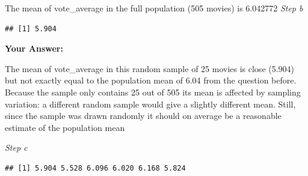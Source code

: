 \documentclass[
]{article}
\newenvironment{Shaded}{\begin{snugshade}}{\end{snugshade}}
\newcommand{\CommentTok}[1]{\textcolor[rgb]{0.56,0.35,0.01}{\textit{#1}}}
\newcommand{\ControlFlowTok}[1]{\textcolor[rgb]{0.13,0.29,0.53}{\textbf{#1}}}
\newcommand{\DecValTok}[1]{\textcolor[rgb]{0.00,0.00,0.81}{#1}}
\newcommand{\FunctionTok}[1]{\textcolor[rgb]{0.13,0.29,0.53}{\textbf{#1}}}
\newcommand{\NormalTok}[1]{#1}
\newcommand{\OtherTok}[1]{\textcolor[rgb]{0.56,0.35,0.01}{#1}}
\newcommand{\SpecialCharTok}[1]{\textcolor[rgb]{0.81,0.36,0.00}{\textbf{#1}}}
\begin{document}
The mean of vote\_average in the full population (505 movies) is
6.042772 \emph{Step b}

\begin{Shaded}
\end{Shaded}

\begin{verbatim}
## [1] 5.904
\end{verbatim}

\textbf{Your Answer:}

The mean of vote\_average in this random sample of 25 movies is close
(5.904) but not exactly equal to the population mean of 6.04 from the
question before. Because the sample only contains 25 out of 505 its mean
is affected by sampling variation: a different random sample would give
a slightly different mean. Still, since the sample was drawn randomly it
should on average be a reasonable estimate of the population mean

\emph{Step c}

\begin{Shaded}
\end{Shaded}

\begin{verbatim}
## [1] 5.904 5.528 6.096 6.020 6.168 5.824
\end{verbatim}
\end{document}

